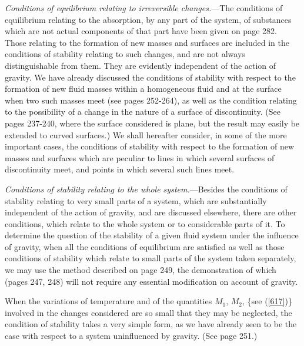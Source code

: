 \documentclass[12pt]{article}
\begin{document}
\textit{Conditions of equilibrium  relating to irreversible changes.}---The
conditions of equilibrium relating to the absorption, by any part of the system, of substances which are not actual components of that part have been given on page 282. Those relating to the formation of new masses and surfaces are included in the conditions of stability relating to such changes, and are not always distinguishable from them. They are evidently independent of the action of gravity. We have already discussed the conditions of stability with respect to the formation of new fluid masses within a homogeneous fluid and at the surface when two such masses meet (see pages 252-264), as well as the condition relating to the possibility of a change in the nature of a surface of discontinuity. (See pages 237-240, where the surface considered is plane, but the result may easily be extended to curved surfaces.) We shall hereafter consider, in some of the more important cases, the conditions of stability with respect to the formation of new masses and surfaces which are peculiar to lines in which several surfaces of discontinuity meet, and points in which several such lines meet.

\textit{Conditions of stability relating to the whole system.}---Besides the conditions of stability relating to very small parts of a system, which are substantially independent of the action of gravity, and are discussed elsewhere, there are other conditions, which relate to the whole system or to considerable parts of it. To determine the question of the stability of a given fluid system under the influence of gravity, when all the conditions of equilibrium are satisfied as well as those conditions of stability which relate to small parts of the system taken separately, we may use the method described on page 249, the demonstration of which (pages 247, 248) will not require any essential modification on account of gravity.

When the variations of temperature and of the quantities $M_1$, $M_2$,  \{see (\ref{617})\} involved in the changes considered are so small that they may be neglected, the condition of stability takes a very simple form, as we have already seen to be the case with respect to a system uninfluenced by gravity. (See page 251.)
\end{document}
